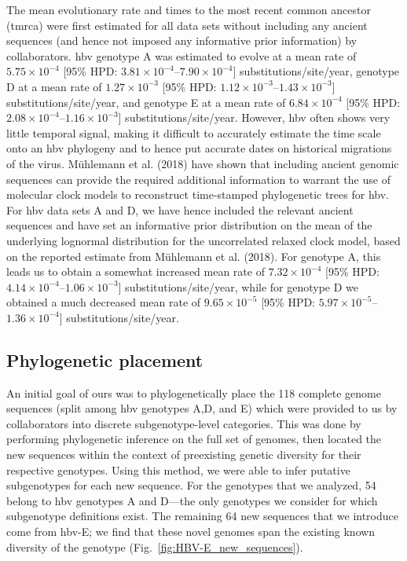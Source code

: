The mean evolutionary rate and times to the most recent common ancestor (\gls{tmrca}) were first estimated for all data sets without including any ancient sequences (and hence not imposed any informative prior information) by collaborators.
\gls{hbv} genotype A was estimated to evolve at a mean rate of $5.75\times10^{-4}$ [95\% HPD: $3.81\times10^{-4}$--$7.90\times10^{-4}$] substitutions/site/year, genotype D at a mean rate of $1.27\times10^{-3}$ [95\% HPD: $1.12\times10^{-3}$--$1.43\times10^{-3}$] substitutions/site/year, and genotype E at a mean rate of $6.84\times10^{-4}$ [95\% HPD: $2.08\times10^{-4}$--$1.16\times10^{-3}$] substitutions/site/year.
However, \gls{hbv} often shows very little temporal signal, making it difficult to accurately estimate the time scale onto an \gls{hbv} phylogeny and to hence put accurate dates on historical migrations of the virus.
M{\"u}hlemann et al. (2018) have shown that including ancient genomic sequences can provide the required additional information to warrant the use of molecular clock models to reconstruct time-stamped phylogenetic trees for \gls{hbv}.
For \gls{hbv} data sets A and D, we have hence included the relevant ancient sequences and have set an informative prior distribution on the mean of the underlying lognormal distribution for the uncorrelated relaxed clock model, based on the reported estimate from M{\"u}hlemann et al. (2018).
For genotype A, this leads us to obtain a somewhat increased mean rate of $7.32\times10^{-4}$ [95\% HPD: $4.14\times10^{-4}$--$1.06\times10^{-3}$] substitutions/site/year, while for genotype D we obtained a much decreased mean rate of $9.65\times10^{-5}$ [95\% HPD: $5.97\times10^{-5}$--$1.36\times10^{-4}$] substitutions/site/year.

\subsection{Phylogenetic placement}

An initial goal of ours was to phylogenetically place the 118 complete genome sequences (split among \gls{hbv} genotypes A,D, and E) which were provided to us by collaborators into discrete subgenotype-level categories.
This was done by performing phylogenetic inference on the full set of genomes, then located the new sequences within the context of preexisting genetic diversity for their respective genotypes.
Using this method, we were able to infer putative subgenotypes for each new sequence.
For the genotypes that we analyzed, 54 belong to \gls{hbv} genotypes A and D---the only genotypes we consider for which subgenotype definitions exist.
The remaining 64 new sequences that we introduce come from \gls{hbv}-E; we find that these novel genomes span the existing known diversity of the genotype (Fig.~\ref{fig:HBV-E_new_sequences}).

